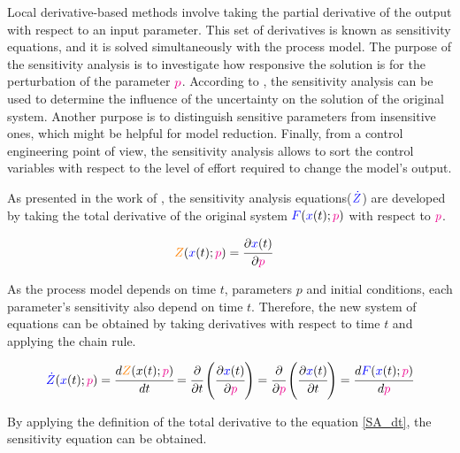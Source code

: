 \documentclass[../Article_Model_Parameters.tex]{subfiles}
\begin{document}
	
	Local derivative-based methods involve taking the partial derivative of the output with respect to an input parameter. This set of derivatives is known as sensitivity equations, and it is solved simultaneously with the process model. The purpose of the sensitivity analysis is to investigate how responsive the solution is for the perturbation of the parameter ${\color{magenta}p}$. According to \citet{Dickinson1976}, the sensitivity analysis can be used to determine the influence of the uncertainty on the solution of the original system. Another purpose is to distinguish sensitive parameters from insensitive ones, which might be helpful for model reduction. Finally, from a control engineering point of view, the sensitivity analysis allows to sort the control variables with respect to the level of effort required to change the model's output.
	
	As presented in the work of \citet{Maly1996}, the sensitivity analysis equations(${\color{blue}\dot{Z}}$) are developed by taking the total derivative of the original system ${\color{blue}F}({\color{blue}x}(t);{\color{magenta}p})$ with respect to ${\color{magenta}p}$.
	
	{\footnotesize
		\begin{align}
			{\color{orange}Z}({\color{blue}x}(t);{\color{magenta}p}) &= \cfrac{\partial {\color{blue}x}(t)}{\partial {\color{magenta}p}}
	\end{align} }
	
	As the process model depends on time $t$, parameters $p$ and initial conditions, each parameter's sensitivity also depend on time $t$. Therefore, the new system of equations can be obtained by taking derivatives with respect to time $t$ and applying the chain rule.
	
	{\footnotesize
		\begin{equation} \label{SA_dt} 
			{\color{blue}\dot{Z}}({\color{blue}x}(t);{\color{magenta}p})  = \cfrac{d {\color{orange}Z}(x(t);{\color{magenta}p})}{d t} = \cfrac{\partial }{\partial t} \left( \cfrac{\partial {\color{blue}x}(t)}{\partial {\color{magenta}p}} \right) = \cfrac{\partial }{\partial {\color{magenta}p}} \left( \cfrac{\partial {\color{blue}x}(t)}{\partial t} \right) = \cfrac{d {\color{blue}F}({\color{blue}x}(t);{\color{magenta}p})}{d {\color{magenta}p}} 
	\end{equation} }
	
	By applying the definition of the total derivative to the equation \ref{SA_dt}, the sensitivity equation can be obtained.
	
\end{document}
